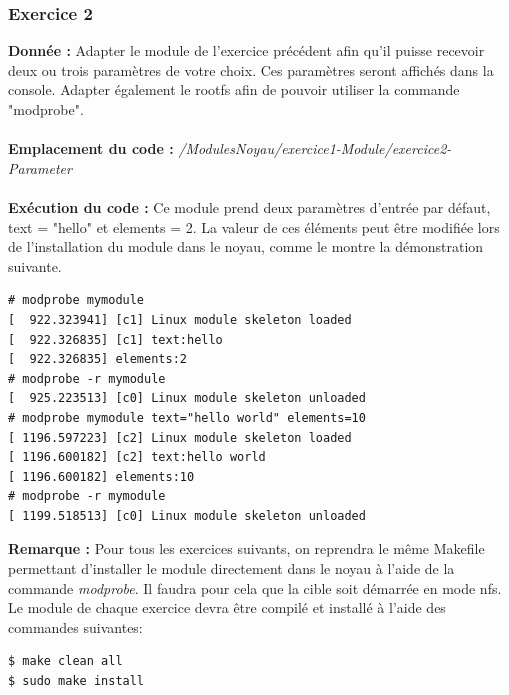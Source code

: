 \subsubsection{Exercice 2}
\textbf{Donnée : } Adapter	le	module	de	l’exercice	précédent	afin	qu’il	puisse	recevoir	deux	ou	trois paramètres de	votre	choix.	Ces	paramètres	seront	affichés dans	la	console.	Adapter	également	le rootfs	afin	de	pouvoir	utiliser	la	commande	"modprobe".\\\\
\textbf{Emplacement du code : } \textit{/ModulesNoyau/exercice1-Module/exercice2-Parameter}\\\\
\textbf{Exécution du code : }Ce module prend deux paramètres d'entrée par défaut, text = "hello" et elements = 2. La valeur de ces éléments peut être modifiée lors de l'installation du module dans le noyau, comme le montre la démonstration suivante.
\begin{lstlisting}
# modprobe mymodule                                                             
[  922.323941] [c1] Linux module skeleton loaded                                
[  922.326835] [c1] text:hello                                                  
[  922.326835] elements:2                                                       
# modprobe -r mymodule                                                          
[  925.223513] [c0] Linux module skeleton unloaded                         
# modprobe mymodule text="hello world" elements=10                              
[ 1196.597223] [c2] Linux module skeleton loaded                                
[ 1196.600182] [c2] text:hello world                                            
[ 1196.600182] elements:10                                                      
# modprobe -r mymodule                                                          
[ 1199.518513] [c0] Linux module skeleton unloaded  
\end{lstlisting}
\textbf{Remarque : } Pour tous les exercices suivants, on reprendra le même Makefile permettant d'installer le module directement dans le noyau à l'aide de la commande \textit{modprobe}. Il faudra pour cela que la cible soit démarrée en mode nfs. Le module de chaque exercice devra être compilé et installé à l'aide des commandes suivantes:
\begin{lstlisting}
$ make clean all
$ sudo make install
\end{lstlisting}
